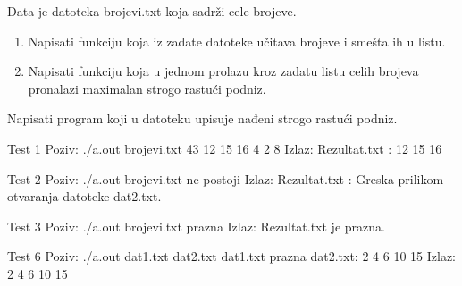 \begin{Answer}[ref=611]
\end{Answer}



\begin{Exercise}[label=612]
Data je datoteka brojevi.txt koja sadrži cele brojeve.
\begin{enumerate}
 \item Napisati funkciju koja iz zadate datoteke učitava brojeve i smešta ih u listu.
 \item Napisati funkciju koja u jednom prolazu kroz zadatu listu celih brojeva 
pronalazi maximalan strogo rastući podniz.
\end{enumerate}
Napisati program koji u datoteku  upisuje nađeni strogo rastući podniz.

\begin{miditest}
  \begin{test}{Test 1}
Poziv: ./a.out
brojevi.txt       
       43 12 15 16 4 2 8
Izlaz: 
Rezultat.txt : 12 15 16
  \end{test}
\end{miditest}



\begin{miditest}
  \begin{test}{Test 2}
Poziv: ./a.out
brojevi.txt ne postoji
Izlaz:
Rezultat.txt : Greska prilikom otvaranja datoteke dat2.txt.
  \end{test}
\end{miditest}

\begin{miditest}
  \begin{test}{Test 3}
Poziv: ./a.out 
brojevi.txt prazna
Izlaz: 
Rezultat.txt  je prazna.
  \end{test}
\end{miditest}
  
  
\begin{miditest}
  \begin{test}{Test 6}
Poziv: ./a.out dat1.txt dat2.txt
dat1.txt prazna
dat2.txt: 2 4 6 10 15
Izlaz: 2 4 6 10 15
  \end{test}
\end{miditest}


\end{Exercise}
\begin{Answer}[ref=612]
\end{Answer}



